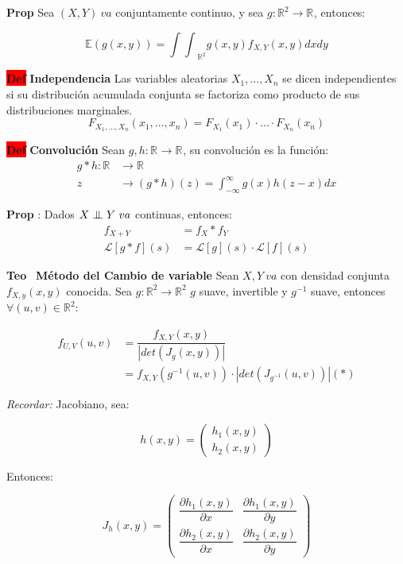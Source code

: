 \documentclass[letterpaper,10.5pt,twocolumn]{article} %
\newcommand{\R}[1][]{\mathbb{R}^{#1}}
\newcommand{\E}{\mathbb{E} }
\newcommand{\hlc}[2][yellow]{ \colorbox{#1}{#2} }
\newcommand{\Prop}{\hlc[amber]{\bfseries Prop}}
\newcommand{\Def}{\hlc[red]{\bfseries Def}}
\newcommand{\Teo}{\hlc[applegreen]{\bfseries Teo}}
\newcommand{\independent}{\perp\mkern-9.5mu\perp}
\begin{document}
\Prop Sea $(X,Y)\ va$ conjuntamente continuo, y sea $g: \R[2] \rightarrow \R $, entonces:

\begin{equation*}
    \E(g(x,y)) = {\int\int}_{\R[2]} g(x,y) f_{X,Y} (x,y) dxdy
\end{equation*}

\Def \textbf{Independencia} Las variables aleatorias $X_1 ,...,X_n$ se dicen independientes si su distribución acumulada conjunta se factoriza como producto de sus distribuciones marginales.
\begin{equation*}
    F_{X_1 ,...,X_n} (x_1 ,...,x_n ) = F_{X_1} (x_1 ) \cdot ... \cdot F_{X_n} (x_n)    
\end{equation*}

\Def \textbf{Convolución} Sean $g,h: \R \rightarrow \R $, su convolución es la función:
\begin{align*}
    g*h: \R &\rightarrow \R \\
    z &\rightarrow (g*h)(z) = \int_{-\infty}^{\infty} g(x) h(z-x) dx
\end{align*}

\Prop: Dados $X \independent Y\ va$ continuas, entonces:
\begin{align*}
    f_{X+Y} &= f_X * f_Y \\
    \mathcal{L}[g*f](s) &= \mathcal{L}[g](s) \cdot \mathcal{L}[f](s) 
\end{align*} 

\Teo\ \textbf{Método del Cambio de variable} Sean $X,Y\ va$ con densidad conjunta $f_{X,y}(x,y) $ conocida. 
Sea $g: \R[2] \rightarrow \R[2] $ $g$ suave, invertible y $g^{-1}$ suave, entonces $\forall(u,v)\in \R[2] $:

\begin{align*}
    f_{U,V} (u,v) &= \dfrac{f_{X,Y} (x,y)}{|det (J_g (x,y) )|}\\
    &= f_{X,Y} (g^{-1} (u,v)) \cdot |det(J_{g^{-1}} (u,v)) | (*)
\end{align*}

\textit{Recordar:} Jacobiano, sea:

\begin{equation*}
    h(x,y) =
\begin{pmatrix}
    h_1 (x,y)\\
    h_2 (x,y)
\end{pmatrix}
\end{equation*}

Entonces:

\begin{equation*}
    J_h (x,y) =
\begin{pmatrix}
    \dfrac{\partial{h_1} (x,y)}{\partial x} & \dfrac{\partial{h_1} (x,y)}{\partial y}\\
    \dfrac{\partial{h_2} (x,y)}{\partial x} & \dfrac{\partial{h_2} (x,y)}{\partial y}
\end{pmatrix}
\end{equation*}
\end{document}
